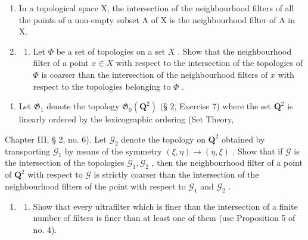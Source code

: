 \begin{enumerate}
\def\labelenumi{\arabic{enumi})}
\setcounter{enumi}{6}
\item
  In a topological space X, the intersection of the neighbourhood filters of all the points of a non-empty subset A of X is the neighbourhood filter of A in X.
\item
  \begin{enumerate}
  \def\labelenumii{\alph{enumii})}
  \tightlist
  \item
    Let \(\Phi\) be a set of topologies on a set \(X\) . Show that the neighbourhood filter of a point \(x \in X\) with respect to the intersection of the topologies of \(\Phi\) is coarser than the intersection of the neighbourhood filters of \(x\) with respect to the topologies belonging to \(\Phi\) .
  \end{enumerate}
\end{enumerate}

\begin{enumerate}
\def\labelenumi{\alph{enumi})}
\setcounter{enumi}{1}
\tightlist
\item
  Let \(\mathfrak{G}_1\) denote the topology \(\mathfrak{G}_0(\mathbf{Q}^2)\) (§ 2, Exercise 7) where the set \(\mathbf{Q}^2\) is linearly ordered by the lexicographic ordering (Set Theory,
\end{enumerate}

Chapter III, § 2, no. 6). Let \(\mathcal{G}_2\) denote the topology on \(\mathbf{Q}^2\) obtained by transporting \(\mathcal{G}_1\) by means of the symmetry \((\xi, \eta) \to (\eta, \xi)\) . Show that if \(\mathcal{G}\) is the intersection of the topologies \(\mathcal{G}_1, \mathcal{G}_2\) , then the neighbourhood filter of a point of \(\mathbf{Q}^2\) with respect to \(\mathcal{G}\) is strictly coarser than the intersection of the neighbourhood filters of the point with respect to \(\mathcal{G}_1\) and \(\mathcal{G}_2\) .

\begin{enumerate}
\def\labelenumi{\arabic{enumi})}
\setcounter{enumi}{8}
\tightlist
\item
  \begin{enumerate}
  \def\labelenumii{\alph{enumii})}
  \tightlist
  \item
    Show that every ultrafilter which is finer than the intersection of a finite number of filters is finer than at least one of them (use Proposition 5 of no. 4).
  \end{enumerate}
\end{enumerate}


